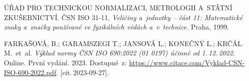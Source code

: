 \begin{thebibliography}{99}
		ÚŘAD PRO TECHNICKOU NORMALIZACI, METROLOGII A~STÁTNÍ ZKUŠEBNICTVÍ.
		ČSN ISO 31-11, \emph{Veličiny a~jednotky -- část 11: Matematické znaky a~značky používané ve fyzikálních vědách a~v~technice.}
		Praha, 1999.

		FARKAŠOVÁ, B.; GARAMSZEGI T.; JANSOVÁ L.; KONEČNÝ L.; KRČÁL M.\ et~al.
		\emph{Výklad normy ČSN ISO 690:2022 (01 0197) účinné od 1.\,12.\,2022}.
		Online. První vydání. 2023.
		Dostupné~z:
		\url{https://www.citace.com/Vyklad-CSN-ISO-690-2022.pdf}.
		[cit.\,2023-09-27].

\end{thebibliography}


%
%
%
